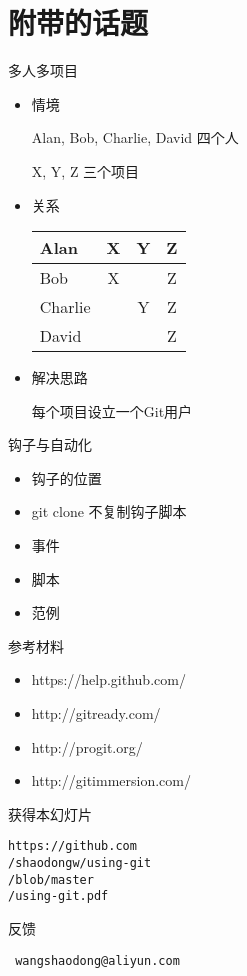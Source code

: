 \part{附带的话题}

\begin{frame}[<+->]{多人多项目}
    \begin{itemize}
        \item 情境

        Alan, Bob, Charlie, David 四个人

        X, Y, Z 三个项目
        \item 关系

\begin{center}
    \begin{tabular}{l|c c c}
        \hline
        Alan    &   X  &  Y  &  Z  \\ \hline
        Bob     &   X  &     &  Z  \\ \hline
        Charlie &      &  Y  &  Z  \\ \hline
        David   &      &     &  Z  \\ \hline
    \end{tabular}
\end{center}

        \item 解决思路

        每个项目设立一个Git用户
    \end{itemize}
\end{frame}


\begin{frame}[<+->][fragile]{钩子与自动化}
    \begin{itemize}
        \item 钩子的位置
        \item git clone 不复制钩子脚本
        \item 事件
        \item 脚本
        \item 范例
    \end{itemize}
\end{frame}

\begin{frame}[fragile]{参考材料}
    \begin{itemize}
        \item https://help.github.com/
        \item http://gitready.com/
        \item http://progit.org/
        \item http://gitimmersion.com/
    \end{itemize}
\end{frame}

\begin{frame}{获得本幻灯片}

{\Large\tt https://github.com\\
/shaodongw/using-git\\
/blob/master\\
/using-git.pdf\\}
\end{frame}

\begin{frame}[<+->][fragile]{反馈}

{\Large\tt
wangshaodong@aliyun.com
}
\end{frame}

